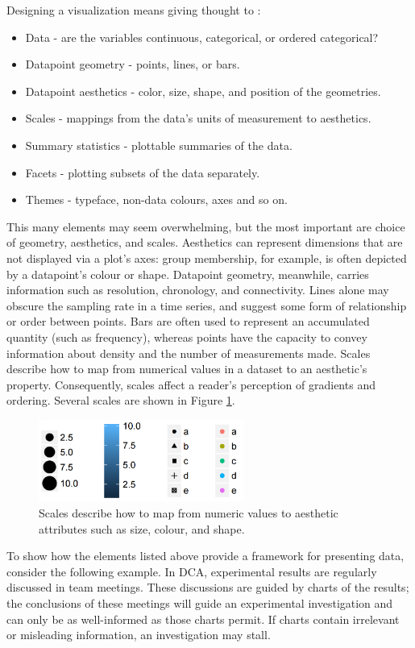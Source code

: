 \documentclass[11pt,a4paper,article]{memoir} %
\begin{document}
Designing a visualization means giving thought to \cite{wickham2009ggplot2}:
\begin{itemize}
\item Data - are the variables continuous, categorical, or ordered categorical?
\item Datapoint geometry - points, lines, or bars.
\item Datapoint aesthetics - color, size, shape, and position of the geometries.
\item Scales - mappings from the data's units of measurement to aesthetics.
\item Summary statistics - plottable summaries of the data.
\item Facets - plotting subsets of the data separately.
\item Themes - typeface, non-data colours, axes and so on.
\end{itemize}
This many elements may seem overwhelming, but the most important are choice of geometry, aesthetics, and scales. Aesthetics can represent dimensions that are not displayed via a plot's axes: group membership, for example, is often depicted by a datapoint's colour or shape. Datapoint geometry, meanwhile, carries information such as resolution, chronology, and connectivity. Lines alone may obscure the sampling rate in a time series, and suggest some form of relationship or order between points. Bars are often used to represent an accumulated quantity (such as frequency), whereas points have the capacity to convey information about density and the number of measurements made. Scales describe how to map from numerical values in a dataset to an aesthetic's property. Consequently, scales affect a reader's perception of gradients and ordering. Several scales are shown in Figure \ref{fig:scales}.
\begin{figure}[h!]
\centering
\includegraphics[width=0.6\textwidth]{scales.png}
\caption{Scales describe how to map from numeric values to aesthetic attributes such as size, colour, and shape.}
\label{fig:scales}
\end{figure}
\vspace{-14pt}

To show how the elements listed above provide a framework for presenting data, consider the following example. In DCA, experimental results are regularly discussed in team meetings. These discussions are guided by charts of the results; the conclusions of these meetings will guide an experimental investigation and can only be as well-informed as those charts permit. If charts contain irrelevant or misleading information, an investigation may stall.
  
\end{document}
